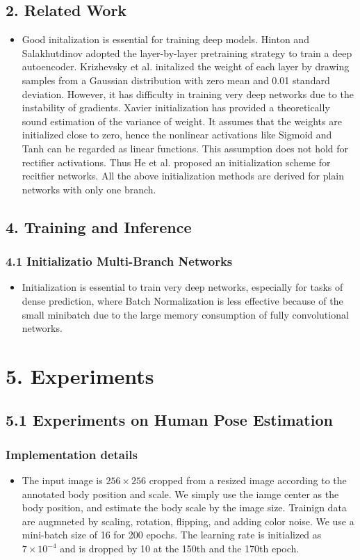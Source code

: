\documentclass{report}
\begin{document}
\subsection*{2. Related Work}
\begin{itemize}
    \item Good initalization is essential for training deep models. Hinton and Salakhutdinov adopted the layer-by-layer pretraining strategy to train a deep autoencoder. Krizhevsky et al. initalized the weight of each layer by drawing samples from a Gaussian distribution with zero mean and 0.01 standard deviation. However, it has difficulty in training very deep networks due to the instability of gradients. Xavier initialization has provided a theoretically sound estimation of the variance of weight. It assumes that the weights are initialized close to zero, hence the nonlinear activations like Sigmoid and Tanh can be regarded as linear functions. This assumption does not hold for rectifier activations. Thus He et al. proposed an initialization scheme for recitfier networks. All the above initialization methods are derived for plain networks with only one branch.
\end{itemize}
\subsection*{4. Training and Inference}
\subsubsection*{4.1 Initializatio Multi-Branch Networks}
\begin{itemize}
    \item Initialization is essential to train very deep networks, especially for tasks of dense prediction, where Batch Normalization is less effective because of the small minibatch due to the large memory consumption of fully convolutional networks.
\end{itemize}
\section*{5. Experiments}
\subsection*{5.1 Experiments on Human Pose Estimation}
\subsubsection*{Implementation details}
\begin{itemize}
    \item The input image is $256 \times 256$ cropped from a resized image according to the annotated body position and scale. We simply use the iamge center as the body position, and estimate the body scale by the image size. Trainign data are augmneted by scaling, rotation, flipping, and adding color noise. We use a mini-batch size of 16 for 200 epochs. The learning rate is initialized as $7 \times 10^{-4}$ and is dropped by 10 at the 150th and the 170th epoch.
\end{itemize}
\end{document}
